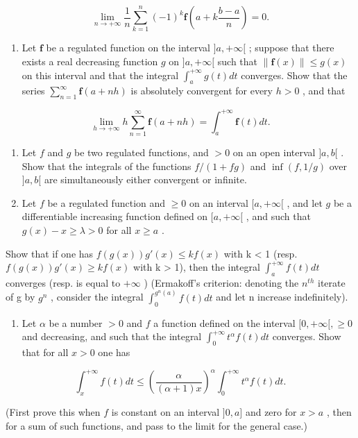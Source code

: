 \[
\lim _ {n \rightarrow + \infty} \frac {1}{n} \sum_ {k = 1} ^ {n} (- 1) ^ {k} \mathbf {f} \left(a + k \frac {b - a}{n}\right) = 0.
\]

\begin{enumerate}
\def\labelenumi{\arabic{enumi})}
\setcounter{enumi}{5}
\tightlist
\item
  Let \(\mathbf{f}\) be a regulated function on the interval \(]a, +\infty[\) ; suppose that there exists a real decreasing function \(g\) on \(]a, +\infty[\) such that \(\| \mathbf{f}(x)\| \leqslant g(x)\) on this interval and that the integral \(\int_{a}^{+\infty}g(t)dt\) converges. Show that the series \(\sum_{n=1}^{\infty}\mathbf{f}(a + nh)\) is absolutely convergent for every \(h > 0\) , and that
\end{enumerate}

\[
\lim _ {h \rightarrow + \infty} h \sum_ {n = 1} ^ {\infty} \mathbf {f} (a + n h) = \int_ {a} ^ {+ \infty} \mathbf {f} (t) d t.
\]

\begin{enumerate}
\def\labelenumi{\arabic{enumi})}
\setcounter{enumi}{6}
\item
  Let \(f\) and \(g\) be two regulated functions, and \(>0\) on an open interval \(]a, b[\) . Show that the integrals of the functions \(f / (1 + fg)\) and \(\inf(f, 1/g)\) over \(]a, b[\) are simultaneously either convergent or infinite.
\item
  Let \(f\) be a regulated function and \(\geqslant 0\) on an interval \([a, +\infty[\) , and let \(g\) be a differentiable increasing function defined on \([a, +\infty[\) , and such that \(g(x) - x \geqslant \lambda > 0\) for all \(x \geqslant a\) .
\end{enumerate}

Show that if one has \(f(g(x))g'(x) \leqslant kf(x)\) with k \textless{} 1 (resp. \(f(g(x))g'(x) \geqslant kf(x)\) with k \textgreater{} 1), then the integral \(\int_{a}^{+\infty} f(t) dt\) converges (resp. is equal to \(+\infty\) ) (Ermakoff's criterion: denoting the \(n^{th}\) iterate of g by \(g^n\) , consider the integral \(\int_{0}^{g^n(a)} f(t) dt\) and let n increase indefinitely).

\begin{enumerate}
\def\labelenumi{\arabic{enumi})}
\setcounter{enumi}{8}
\tightlist
\item
  Let \(\alpha\) be a number \(>0\) and \(f\) a function defined on the interval \([0, +\infty[, \geqslant 0\) and decreasing, and such that the integral \(\int_0^{+\infty} t^\alpha f(t) dt\) converges. Show that for all \(x > 0\) one has
\end{enumerate}

\[
\int_ {x} ^ {+ \infty} f (t) d t \leqslant \left(\frac {\alpha}{(\alpha + 1) x}\right) ^ {\alpha} \int_ {0} ^ {+ \infty} t ^ {\alpha} f (t) d t.
\]

(First prove this when \(f\) is constant on an interval \(]0, a]\) and zero for \(x > a\) , then for a sum of such functions, and pass to the limit for the general case.)

